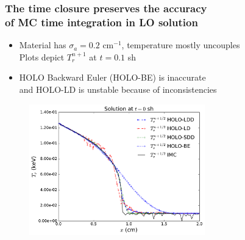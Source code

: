 \documentclass[xcolor=dvipsnames,hyperref={pdfpagelabels=false},unknownkeysallowed]{beamer}
\newcommand{\colG}[1]{{\color{Gray!110} #1}}
\newlength{\wideitemsep}
\let\olditem\item
\renewcommand{\item}{\setlength{\itemsep}{\wideitemsep}\olditem}
\begin{document}
\begin{frame}
    \frametitle{The time closure preserves the accuracy \\ of MC time
    integration in LO solution} %
    \fontsize{10.0pt}{10.0pt}\selectfont
    \vspace{0.1in}
    \begin{itemize}
        \item Material has $\sigma_a = 0.2$ cm$^{-1}$, temperature mostly uncouples  \\
            \colG{Plots depict $T_{r}^{n+1}$ at $t=0.1$ sh}
        \item HOLO Backward Euler (HOLO-BE) is inaccurate
            \\ \colG{and HOLO-LD is unstable because of inconsistencies}
    \end{itemize}
\begin{figure}[H]
  \centering
    \includegraphics[width=0.6790\textwidth]{thin_temp_compare.pdf}
\end{figure}
\end{frame}
\end{document}
